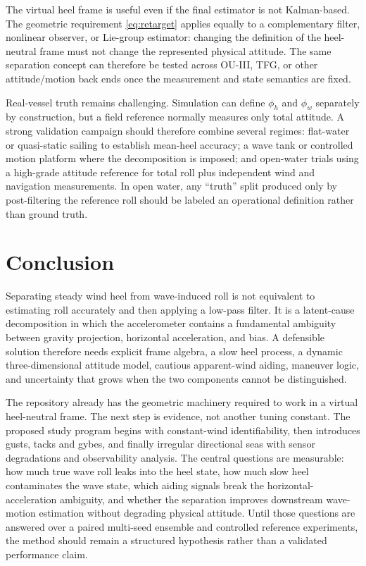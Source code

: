 \documentclass[conference]{IEEEtran}
\begin{document}
The virtual heel frame is useful even if the final estimator is not Kalman-based. The
geometric requirement \eqref{eq:retarget} applies equally to a complementary filter,
nonlinear observer, or Lie-group estimator: changing the definition of the heel-neutral
frame must not change the represented physical attitude. The same separation concept can
therefore be tested across OU-III, TFG, or other attitude/motion back ends once the
measurement and state semantics are fixed.

Real-vessel truth remains challenging. Simulation can define $\phi_h$ and $\phi_w$
separately by construction, but a field reference normally measures only total attitude.
A strong validation campaign should therefore combine several regimes: flat-water or
quasi-static sailing to establish mean-heel accuracy; a wave tank or controlled motion
platform where the decomposition is imposed; and open-water trials using a high-grade
attitude reference for total roll plus independent wind and navigation measurements. In
open water, any ``truth'' split produced only by post-filtering the reference roll should
be labeled an operational definition rather than ground truth.

\section{Conclusion}
\label{sec:conclusion}

Separating steady wind heel from wave-induced roll is not equivalent to estimating roll
accurately and then applying a low-pass filter. It is a latent-cause decomposition in
which the accelerometer contains a fundamental ambiguity between gravity projection,
horizontal acceleration, and bias. A defensible solution therefore needs explicit frame
algebra, a slow heel process, a dynamic three-dimensional attitude model, cautious
apparent-wind aiding, maneuver logic, and uncertainty that grows when the two components
cannot be distinguished.

The repository already has the geometric machinery required to work in a virtual
heel-neutral frame. The next step is evidence, not another tuning constant. The proposed
study program begins with constant-wind identifiability, then introduces gusts, tacks and
gybes, and finally irregular directional seas with sensor degradations and observability
analysis. The central questions are measurable: how much true wave roll leaks into the
heel state, how much slow heel contaminates the wave state, which aiding signals break
the horizontal-acceleration ambiguity, and whether the separation improves downstream
wave-motion estimation without degrading physical attitude. Until those questions are
answered over a paired multi-seed ensemble and controlled reference experiments, the
method should remain a structured hypothesis rather than a validated performance claim.



\end{document}
